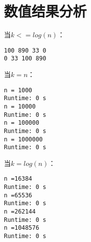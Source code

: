 \documentclass[a4paper]{article}
\begin{document}
\section{数值结果分析}
当$k <= log(n)$：
{\footnotesize
\begin{lstlisting}
100 890 33 0 
0 33 100 890
\end{lstlisting}
}

当$k = n$：
{\footnotesize
\begin{lstlisting}
n = 1000
Runtime: 0 s
n = 10000
Runtime: 0 s
n = 100000
Runtime: 0 s
n = 1000000
Runtime: 0 s
\end{lstlisting}
}

当$k = log(n)$：
{\footnotesize
\begin{lstlisting}
n =16384
Runtime: 0 s
n =65536
Runtime: 0 s
n =262144
Runtime: 0 s
n =1048576
Runtime: 0 s
\end{lstlisting}
}
\end{document}
